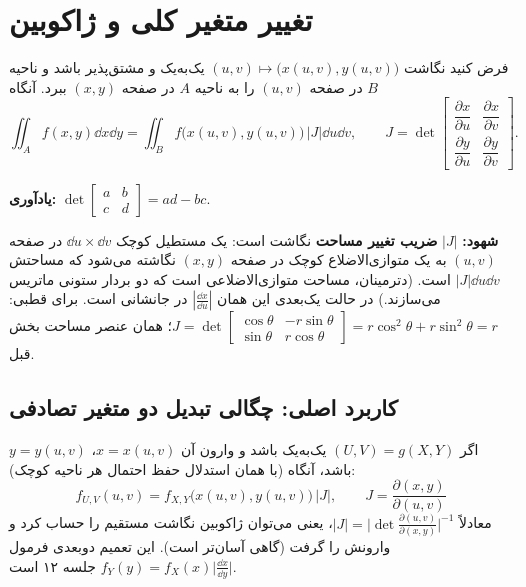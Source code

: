 \section{تغییر متغیر کلی و ژاکوبین}

\begin{theorem}
فرض کنید نگاشت $(u,v)\mapsto\big(x(u,v),y(u,v)\big)$ یک‌به‌یک و مشتق‌پذیر باشد و ناحیه $B$ در صفحه $(u,v)$ را به ناحیه $A$ در صفحه $(x,y)$ ببرد. آنگاه
\[
\iint_Af(x,y)\dd x\dd y=\iint_Bf\big(x(u,v),y(u,v)\big)\,|J|\dd u\dd v,\qquad
J=\det\begin{bmatrix}\dfrac{\partial x}{\partial u}&\dfrac{\partial x}{\partial v}\\[3mm]\dfrac{\partial y}{\partial u}&\dfrac{\partial y}{\partial v}\end{bmatrix}.
\]
\end{theorem}
\textbf{یادآوری:} $\det\begin{bmatrix}a&b\\c&d\end{bmatrix}=ad-bc$.

\textbf{شهود:} $|J|$ \textbf{ضریب تغییر مساحت} نگاشت است: یک مستطیل کوچک $\dd u\times\dd v$ در صفحه $(u,v)$ به یک متوازی‌الاضلاع کوچک در صفحه $(x,y)$ نگاشته می‌شود که مساحتش $|J|\dd u\dd v$ است. (دترمینان، مساحت متوازی‌الاضلاعی است که دو بردار ستونی ماتریس می‌سازند.) در حالت یک‌بعدی این همان $|\frac{\dd x}{\dd u}|$ در جانشانی است. برای قطبی: $J=\det\begin{bmatrix}\cos\theta&-r\sin\theta\\\sin\theta&r\cos\theta\end{bmatrix}=r\cos^2\theta+r\sin^2\theta=r$؛ همان عنصر مساحت بخش قبل.

\subsection{کاربرد اصلی: چگالی تبدیل دو متغیر تصادفی}
اگر $(U,V)=g(X,Y)$ یک‌به‌یک باشد و وارون آن $x=x(u,v)$، $y=y(u,v)$ باشد، آنگاه (با همان استدلال حفظ احتمال هر ناحیه کوچک):
\[
\boxed{\ f_{U,V}(u,v)=f_{X,Y}\big(x(u,v),y(u,v)\big)\,\big|J\big|,\qquad J=\frac{\partial(x,y)}{\partial(u,v)}\ }
\]
معادلاً $|J|=\Big|\det\frac{\partial(u,v)}{\partial(x,y)}\Big|^{-1}$، یعنی می‌توان ژاکوبین نگاشت مستقیم را حساب کرد و وارونش را گرفت (گاهی آسان‌تر است). این تعمیم دوبعدی فرمول $f_Y(y)=f_X(x)\big|\frac{\dd x}{\dd y}\big|$ جلسه ۱۲ است.

